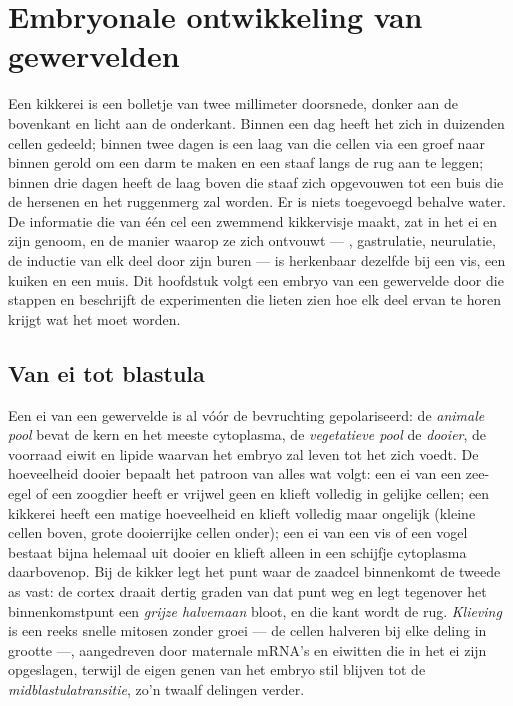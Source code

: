 \chapter{Embryonale ontwikkeling van gewervelden}\label{ch:b2:vertebrate-development}

Een kikkerei is een bolletje van twee millimeter doorsnede, donker aan de
bovenkant en licht aan de onderkant. Binnen een dag heeft het zich in
duizenden cellen gedeeld; binnen twee dagen is een laag van die cellen
via een groef naar binnen gerold om een darm te maken en een staaf langs de
rug aan te leggen; binnen drie dagen heeft de laag boven die staaf zich
opgevouwen tot een buis die de hersenen en het ruggenmerg zal worden. Er
is niets toegevoegd behalve water. De informatie die van één cel een
zwemmend kikkervisje maakt, zat in het ei en zijn genoom, en de manier
waarop ze zich ontvouwt --- , gastrulatie, neurulatie, de inductie
van elk deel door zijn buren --- is herkenbaar dezelfde bij een vis, een
kuiken en een muis. Dit hoofdstuk volgt een embryo van een gewervelde door
die stappen en beschrijft de experimenten die lieten zien hoe elk deel
ervan te horen krijgt wat het moet worden.

\section{Van ei tot blastula}

\begin{definition}\label{def:b2:vertebrate-development:egg}
Een ei van een gewervelde is al vóór de bevruchting gepolariseerd: de
\emph{animale pool} bevat de kern en het meeste cytoplasma, de
\emph{vegetatieve pool} de \emph{dooier}, de voorraad eiwit en lipide
waarvan het embryo zal leven tot het zich voedt. De hoeveelheid dooier
bepaalt het patroon van alles wat volgt: een ei van een zee-egel of een
zoogdier heeft er vrijwel geen en klieft volledig in gelijke cellen; een
kikkerei heeft een matige hoeveelheid en klieft volledig maar ongelijk
(kleine cellen boven, grote dooierrijke cellen onder); een ei van een vis
of een vogel bestaat bijna helemaal uit dooier en klieft alleen in een
schijfje cytoplasma daarbovenop. Bij de kikker legt het punt waar de
zaadcel binnenkomt de tweede as vast: de cortex draait dertig graden van
dat punt weg en legt tegenover het binnenkomstpunt een \emph{grijze
halvemaan} bloot, en die kant wordt de rug. \emph{Klieving} is een reeks
snelle mitosen zonder groei --- de cellen halveren bij elke deling in
grootte ---, aangedreven door maternale mRNA's en eiwitten die in het ei
zijn opgeslagen, terwijl de eigen genen van het embryo stil blijven tot de
\emph{midblastulatransitie}, zo'n twaalf delingen verder.
\end{definition}

